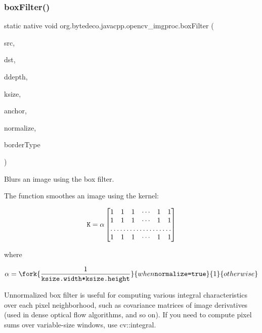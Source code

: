 \subsubsection{\texorpdfstring{box\+Filter()}{boxFilter()}}
{\footnotesize\ttfamily static native void org.\+bytedeco.\+javacpp.\+opencv\+\_\+imgproc.\+box\+Filter (\begin{DoxyParamCaption}\item[{@By\+Val Mat}]{src,  }\item[{@By\+Val Mat}]{dst,  }\item[{int}]{ddepth,  }\item[{@By\+Val Size}]{ksize,  }\item[{@By\+Val(null\+Value=\char`\"{}cv\+::\+fr.antproject.utils.Point(-\/1,-\/1)\char`\"{}) fr.antproject.utils.Point}]{anchor,  }\item[{@Cast(\char`\"{}bool\char`\"{}) boolean}]{normalize,  }\item[{int}]{border\+Type }\end{DoxyParamCaption})\hspace{0.3cm}{\ttfamily [static]}}



Blurs an image using the box filter. 

The function smoothes an image using the kernel\+: 

\[\texttt{K} = \alpha \begin{bmatrix} 1 & 1 & 1 & \cdots & 1 & 1 \\ 1 & 1 & 1 & \cdots & 1 & 1 \\ \hdotsfor{6} \\ 1 & 1 & 1 & \cdots & 1 & 1 \end{bmatrix}\] 

where 

\[\alpha = \fork{\frac{1}{\texttt{ksize.width*ksize.height}}}{when \texttt{normalize=true}}{1}{otherwise}\] 

Unnormalized box filter is useful for computing various integral characteristics over each pixel neighborhood, such as covariance matrices of image derivatives (used in dense optical flow algorithms, and so on). If you need to compute pixel sums over variable-\/size windows, use cv\+::integral. 


